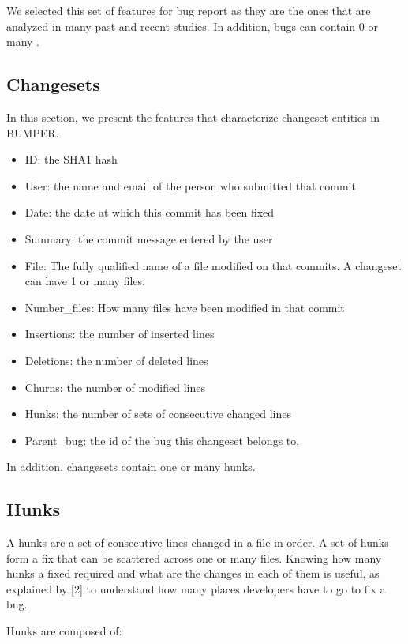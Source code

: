 We selected this set of features for bug report as they are the ones
that are analyzed in many past and recent studies. In addition, bugs can
contain 0 or many .

\subsection{Changesets}\label{changesets}

In this section, we present the features that characterize changeset
entities in BUMPER.

\begin{itemize}
\item
  ID: the SHA1 hash
\item
  User: the name and email of the person who submitted that commit
\item
  Date: the date at which this commit has been fixed
\item
  Summary: the commit message entered by the user
\item
  File: The fully qualified name of a file modified on that commits. A
  changeset can have 1 or many files.
\item
  Number\_files: How many files have been modified in that commit
\item
  Insertions: the number of inserted lines
\item
  Deletions: the number of deleted lines
\item
  Churns: the number of modified lines
\item
  Hunks: the number of sets of consecutive changed lines
\item
  Parent\_bug: the id of the bug this changeset belongs to.
\end{itemize}

In addition, changesets contain one or many hunks.

\subsection{Hunks}\label{hunks}

A hunks are a set of consecutive lines changed in a file in order. A set
of hunks form a fix that can be scattered across one or many files.
Knowing how many hunks a fixed required and what are the changes in each
of them is useful, as explained by {[}2{]} to understand how many places
developers have to go to fix a bug.

Hunks are composed of:


